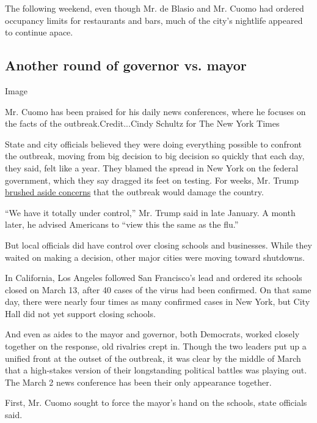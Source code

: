 The following weekend, even though Mr. de Blasio and Mr. Cuomo had
ordered occupancy limits for restaurants and bars, much of the city's
nightlife appeared to continue apace.

\hypertarget{another-round-of-governor-vs-mayor}{%
\subsection{Another round of governor vs.
mayor}\label{another-round-of-governor-vs-mayor}}

Image

Mr. Cuomo has been praised for his daily news conferences, where he
focuses on the facts of the outbreak.Credit...Cindy Schultz for The New
York Times

State and city officials believed they were doing everything possible to
confront the outbreak, moving from big decision to big decision so
quickly that each day, they said, felt like a year. They blamed the
spread in New York on the federal government, which they say dragged its
feet on testing. For weeks, Mr. Trump
\href{https://www.nytimes3xbfgragh.onion/video/us/politics/100000007067717/trumps-coronavirus-statements.html}{brushed
aside concerns} that the outbreak would damage the country.

``We have it totally under control,'' Mr. Trump said in late January. A
month later, he advised Americans to ``view this the same as the flu.''

But local officials did have control over closing schools and
businesses. While they waited on making a decision, other major cities
were moving toward shutdowns.

In California, Los Angeles followed San Francisco's lead and ordered its
schools closed on March 13, after 40 cases of the virus had been
confirmed. On that same day, there were nearly four times as many
confirmed cases in New York, but City Hall did not yet support closing
schools.

And even as aides to the mayor and governor, both Democrats, worked
closely together on the response, old rivalries crept in. Though the two
leaders put up a unified front at the outset of the outbreak, it was
clear by the middle of March that a high-stakes version of their
longstanding political battles was playing out. The March 2 news
conference has been their only appearance together.

First, Mr. Cuomo sought to force the mayor's hand on the schools, state
officials said.

